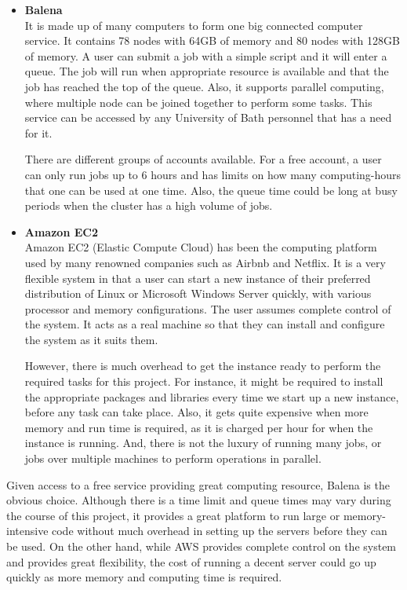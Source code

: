 \begin{itemize}
  \item \textbf{Balena} \\ 
    It is made up of many computers to form one big connected computer service. It contains 78 nodes with 64GB of memory and 80 nodes with 128GB of memory. A user can submit a job with a simple script and it will enter a queue. The job will run when appropriate resource is available and that the job has reached the top of the queue. Also, it supports parallel computing, where multiple node can be joined together to perform some tasks. This service can be accessed by any University of Bath personnel that has a need for it. 
    
    There are different groups of accounts available. For a free account, a user can only run jobs up to 6 hours and has limits on how many computing-hours that one can be used at one time. Also, the queue time could be long at busy periods when the cluster has a high volume of jobs. 
  \\ 
  \item \textbf{Amazon EC2} \\
    Amazon EC2 (Elastic Compute Cloud) has been the computing platform used by many renowned companies such as Airbnb and Netflix. It is a very flexible system in that a user can start a new instance of their preferred distribution of Linux or  Microsoft Windows Server quickly, with various processor and memory configurations. The user assumes complete control of the system. It acts as a real machine so that they can install and configure the system as it suits them. 
    
    However, there is much overhead to get the instance ready to perform the required tasks for this project. For instance, it might be required to install the appropriate packages and libraries every time we start up a new instance, before any task can take place. Also, it gets quite expensive when more memory and run time is required, as it is charged per hour for when the instance is running. And, there is not the luxury of running many jobs, or jobs over multiple machines to perform operations in parallel.
\end{itemize}

Given access to a free service providing great computing resource, Balena is the obvious choice. Although there is a time limit and queue times may vary during the course of this project, it provides a great platform to run large or memory-intensive code without much overhead in setting up the servers before they can be used. On the other hand, while AWS provides complete control on the system and provides great flexibility, the cost of running a decent server could go up quickly as more memory and computing time is required.


